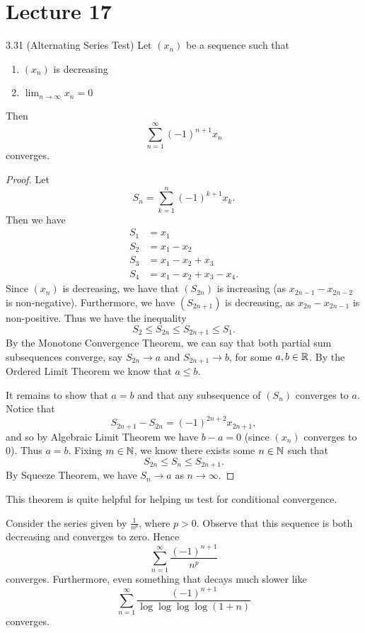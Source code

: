 \documentclass[class=article, crop=false]{standalone}
\begin{document}
  \section{Lecture 17}
  \begin{theorem}{3.31 (Alternating Series Test)}
    Let $(x_n)$ be a sequence such that
    \begin{enumerate}[label=(\roman*)]
      \item $(x_n)$ is decreasing
      \item $\lim_{n\to \infty} x_n = 0$
    \end{enumerate}
    Then
    \[
      \sum_{n=1}^{\infty}(-1)^{n + 1}x_n
    \]
    converges.
    \begin{proof}
      Let
      \[
        S_n = \sum_{k=1}^{n} (-1)^{k + 1}x_k.
      \]
      Then we have
      \begin{align*}
        S_1 &= x_1 \\
        S_2 &= x_1 - x_2 \\
        S_3 &= x_1 - x_2 + x_3 \\
        S_4 &= x_1 - x_2 + x_3 - x_4.
      \end{align*}
      Since $(x_n)$ is decreasing, we have that $(S_{2n})$ is increasing (as $x_{2n - 1} - x_{2n - 2}$ is non-negative). Furthermore, we have $(S_{2n+1})$ is decreasing, as $x_{2n} - x_{2n - 1}$ is non-positive. Thus we have the inequality
      \[
        S_2\leq S_{2n}\leq S_{2n+1}\leq S_1.
      \]
      By the Monotone Convergence Theorem, we can say that both partial sum subsequences converge, say $S_{2n}\to a$ and $S_{2n+1}\to b$, for some $a,b\in\mathbb{R}$. By the Ordered Limit Theorem we know that $a\leq b$. \par
      It remains to show that $a = b$ and that any subsequence of $(S_n)$ converges to $a$. Notice that
      \[
        S_{2n + 1} - S_{2n} = (-1)^{2n+ 2}x_{2n + 1},
      \]
      and so by Algebraic Limit Theorem we have $b - a = 0$ (since $(x_n)$ converges to $0$). Thus $a = b$. Fixing $m\in\mathbb{N}$, we know there exists some $n\in\mathbb{N}$ such that
      \[
        S_{2n}\leq S_n\leq S_{2n+1}.
      \]
      By Squeeze Theorem, we have $S_n\to a$ as $n\to\infty$.
    \end{proof}
  \end{theorem}
  \begin{note}{}
    This theorem is quite helpful for helping us test for conditional convergence.
  \end{note}
  \begin{example}{}
    Consider the series given by $\frac{1}{n^p}$, where $p > 0$. Observe that this sequence is both decreasing and converges to zero. Hence
    \[
      \sum_{n=1}^{\infty} \frac{(-1)^{n+1}}{n^p}
    \]
    converges. Furthermore, even something that decays much slower like
    \[
      \sum_{n=1}^{\infty} \frac{(-1)^{n+1}}{\log\log\log\log(1 + n)}
    \]
    converges.
  \end{example}
\end{document}
